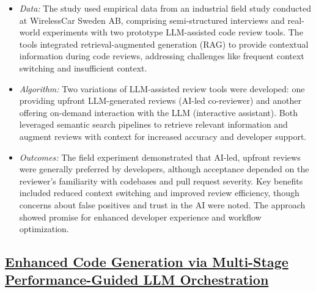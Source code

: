 \documentclass[12pt,a4paper]{article}
\begin{document}
\begin{itemize}[leftmargin=1.5em]
    \item \textit{Data:} The study used empirical data from an industrial field study conducted at WirelessCar Sweden 
    AB, comprising semi-structured interviews and real-world experiments with two prototype LLM-assisted code review 
    tools. The tools integrated retrieval-augmented generation (RAG) to provide contextual information during code 
    reviews, addressing challenges like frequent context switching and insufficient context.
    \item \textit{Algorithm:} Two variations of LLM-assisted review tools were developed: one providing upfront 
    LLM-generated reviews (AI-led co-reviewer) and another offering on-demand interaction with the LLM (interactive 
    assistant). Both leveraged semantic search pipelines to retrieve relevant information and augment reviews with 
    context for increased accuracy and developer support.
    \item \textit{Outcomes:} The field experiment demonstrated that AI-led, upfront reviews were generally preferred by 
    developers, although acceptance depended on the reviewer’s familiarity with codebases and pull request severity. Key 
    benefits included reduced context switching and improved review efficiency, though concerns about false positives 
    and trust in the AI were noted. The approach showed promise for enhanced developer experience and workflow 
    optimization.
\end{itemize}

\subsection{\href{https://arxiv.org/abs/2510.01379}{Enhanced Code Generation via Multi-Stage Performance-Guided LLM 
Orchestration}}
\end{document}
